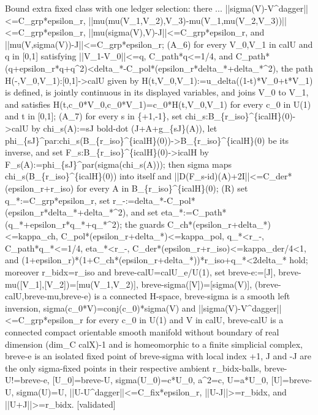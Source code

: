 \documentclass{article}
\newcommand{\steptag}[1]{\hfill{\small\textsf{[#1]}}}
\begin{document}
\begin{proofbox}{Bound extra fixed class with one ledger selection: there ...}
||sigma(V)-V\textasciicircum{}dagger||<=C\_grp*epsilon\_r, ||mu(mu(V\_1,V\_2),V\_3)-mu(V\_1,mu(V\_2,V\_3))||<=C\_grp*epsilon\_r, ||mu(sigma(V),V)-J||<=C\_grp*epsilon\_r, and ||mu(V,sigma(V))-J||<=C\_grp*epsilon\_r; (A\_6) for every V\_0,V\_1 in calU and q in [0,1] satisfying ||V\_1-V\_0||<=q, C\_path*q<=1/4, and C\_path*(q+epsilon\_r*q+q\textasciicircum{}2)<delta\_*-C\_pol*(epsilon\_r*delta\_*+delta\_*\textasciicircum{}2), the path H(-,V\_0,V\_1):[0,1]->calU given by H(t,V\_0,V\_1):=u\_delta((1-t)*V\_0+t*V\_1) is defined, is jointly continuous in its displayed variables, and joins V\_0 to V\_1, and satisfies H(t,c\_0*V\_0,c\_0*V\_1)=c\_0*H(t,V\_0,V\_1) for every c\_0 in U(1) and t in [0,1]; (A\_7) for every s in \{+1,-1\}, set chi\_s:B\_\{r\_iso\}\textasciicircum{}\{icalH\}(0)->calU by chi\_s(A):=sJ bold-dot (J+A+g\_\{sJ\}(A)), let phi\_\{sJ\}\textasciicircum{}par:chi\_s(B\_\{r\_iso\}\textasciicircum{}\{icalH\}(0))->B\_\{r\_iso\}\textasciicircum{}\{icalH\}(0) be its inverse, and set F\_s:B\_\{r\_iso\}\textasciicircum{}\{icalH\}(0)->icalH by F\_s(A):=phi\_\{sJ\}\textasciicircum{}par(sigma(chi\_s(A))); then sigma maps chi\_s(B\_\{r\_iso\}\textasciicircum{}\{icalH\}(0)) into itself and ||D(F\_s-id)(A)+2I||<=C\_der*(epsilon\_r+r\_iso) for every A in B\_\{r\_iso\}\textasciicircum{}\{icalH\}(0); (R) set q\_*:=C\_grp*epsilon\_r, set r\_-:=delta\_*-C\_pol*(epsilon\_r*delta\_*+delta\_*\textasciicircum{}2), and set eta\_*:=C\_path*(q\_*+epsilon\_r*q\_*+q\_*\textasciicircum{}2); the guards C\_ch*(epsilon\_r+delta\_*)<=kappa\_ch, C\_pol*(epsilon\_r+delta\_*)<=kappa\_pol, q\_*<r\_-, C\_path*q\_*<=1/4, eta\_*<r\_-, C\_der*(epsilon\_r+r\_iso)<=kappa\_der/4<1, and (1+epsilon\_r)*(1+C\_ch*(epsilon\_r+delta\_*))*r\_iso+q\_*<2delta\_* hold; moreover r\_bidx=r\_iso and breve-calU=calU\_e/U(1), set breve-e:=[J], breve-mu([V\_1],[V\_2])=[mu(V\_1,V\_2)], breve-sigma([V])=[sigma(V)], (breve-calU,breve-mu,breve-e) is a connected H-space, breve-sigma is a smooth left inversion, sigma(c\_0*V)=conj(c\_0)*sigma(V) and ||sigma(V)-V\textasciicircum{}dagger||<=C\_grp*epsilon\_r for every c\_0 in U(1) and V in calU, breve-calU is a connected compact orientable smooth manifold without boundary of real dimension (dim\_C calX)-1 and is homeomorphic to a finite simplicial complex, breve-e is an isolated fixed point of breve-sigma with local index +1, J and -J are the only sigma-fixed points in their respective ambient r\_bidx-balls, breve-U!=breve-e, [U\_0]=breve-U, sigma(U\_0)=c*U\_0, a\textasciicircum{}2=c, U=a*U\_0, [U]=breve-U, sigma(U)=U, ||U-U\textasciicircum{}dagger||<=C\_fix*epsilon\_r, ||U-J||>=r\_bidx, and ||U+J||>=r\_bidx. \steptag{validated} \\[6pt]

\end{proofbox}
\end{document}
